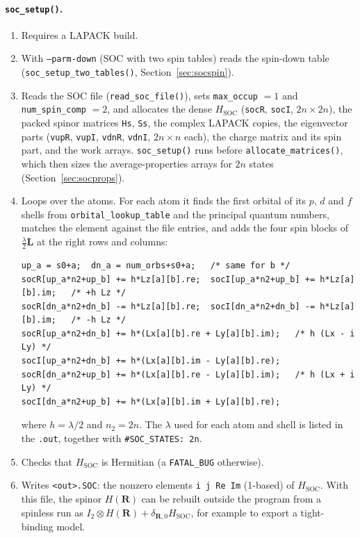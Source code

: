 \documentclass[11pt,a4paper]{article}
\newcommand{\fn}[1]{\texttt{#1()}}
\newcommand{\var}[1]{\texttt{#1}}
\newcommand{\opt}[1]{\texttt{#1}}
\newcommand{\Hsoc}{H_{\mathrm{SOC}}}
\begin{document}
\paragraph{\fn{soc\_setup}.}
\begin{enumerate}
\item Requires a LAPACK build.
\item With \opt{--parm-down} (SOC with two spin tables) reads the spin-down table
  (\fn{soc\_setup\_two\_tables}, Section~\ref{sec:socspin}).
\item Reads the SOC file (\fn{read\_soc\_file}), sets \var{max\_occup} $=1$ and
  \var{num\_spin\_comp} $=2$, and allocates the dense $\Hsoc$ (\var{socR}, \var{socI},
  $2n\times2n$), the packed spinor matrices \var{Hs}, \var{Ss}, the complex LAPACK copies,
  the eigenvector parts (\var{vupR}, \var{vupI}, \var{vdnR}, \var{vdnI}, $2n\times n$
  each), the charge matrix and its spin part, and the work arrays. \fn{soc\_setup} runs
  before \fn{allocate\_matrices}, which then sizes the average-properties arrays for $2n$
  states (Section~\ref{sec:socprops}).
\item Loops over the atoms. For each atom it finds the first orbital of its $p$, $d$ and
  $f$ shells from \var{orbital\_lookup\_table} and the principal quantum numbers, matches
  the element against the file entries, and adds the four spin blocks of
  $\frac{\lambda}{2}\mathbf{L}$ at the right rows and columns:
\begin{lstlisting}
up_a = s0+a;  dn_a = num_orbs+s0+a;   /* same for b */
socR[up_a*n2+up_b] += h*Lz[a][b].re;  socI[up_a*n2+up_b] += h*Lz[a][b].im;   /* +h Lz */
socR[dn_a*n2+dn_b] -= h*Lz[a][b].re;  socI[dn_a*n2+dn_b] -= h*Lz[a][b].im;   /* -h Lz */
socR[up_a*n2+dn_b] += h*(Lx[a][b].re + Ly[a][b].im);   /* h (Lx - i Ly) */
socI[up_a*n2+dn_b] += h*(Lx[a][b].im - Ly[a][b].re);
socR[dn_a*n2+up_b] += h*(Lx[a][b].re - Ly[a][b].im);   /* h (Lx + i Ly) */
socI[dn_a*n2+up_b] += h*(Lx[a][b].im + Ly[a][b].re);
\end{lstlisting}
  where $h=\lambda/2$ and $n_2=2n$. The $\lambda$ used for each atom and shell is listed in
  the \texttt{.out}, together with \texttt{\#SOC\_STATES: 2n}.
\item Checks that $\Hsoc$ is Hermitian (a \texttt{FATAL\_BUG} otherwise).
\item Writes \texttt{<out>.SOC}: the nonzero elements \texttt{i j Re Im} (1-based) of
  $\Hsoc$. With this file, the spinor $H(\mathbf{R})$ can be rebuilt outside the program
  from a spinless run as $I_2\otimes H(\mathbf{R})+\delta_{\mathbf{R},0}\Hsoc$, for
  example to export a tight-binding model.
\end{enumerate}
\end{document}

